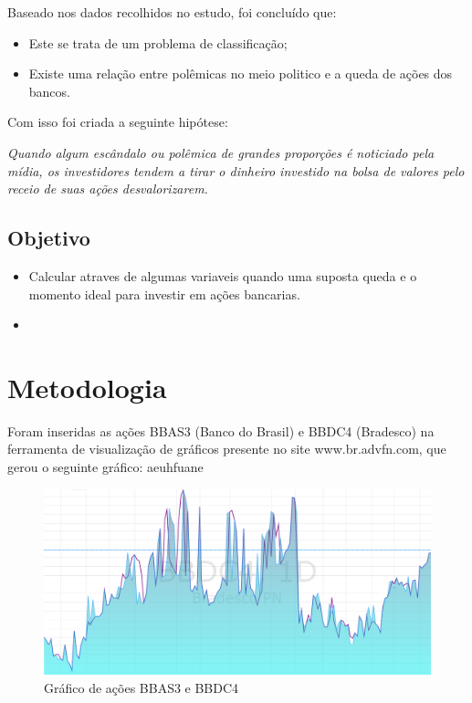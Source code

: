 \documentclass{sigchi}
\begin{document}
 Baseado nos dados recolhidos no estudo, foi concluído que: 
 \begin{itemize}
 
 \item{Este se trata de um problema de classificação;}
 \item{Existe uma relação entre polêmicas no meio politico e a queda de ações dos bancos.}
 
 \end{itemize}
Com isso foi criada a seguinte hipótese: 

\textit{
Quando algum escândalo ou polêmica de grandes proporções é noticiado pela mídia, os investidores tendem a tirar o dinheiro investido na bolsa de valores pelo receio de suas ações desvalorizarem.
}

\subsection{Objetivo}

\begin{itemize}
	
	\item Calcular atraves de algumas variaveis quando uma suposta queda e o momento ideal para investir em ações bancarias.
	\item 
\end{itemize}


\section{Metodologia}
Foram inseridas as ações BBAS3 (Banco do Brasil) e BBDC4 (Bradesco) na ferramenta de visualização de gráficos presente no site www.br.advfn.com, que gerou o seguinte gráfico: aeuhfuane 

 \begin{figure}[!htb]
\centering
\includegraphics[scale=0.27]{./figures/figura1.png}
\caption{Gráfico de ações BBAS3 e BBDC4}
\label{fig1}
\end{figure}
\end{document}

